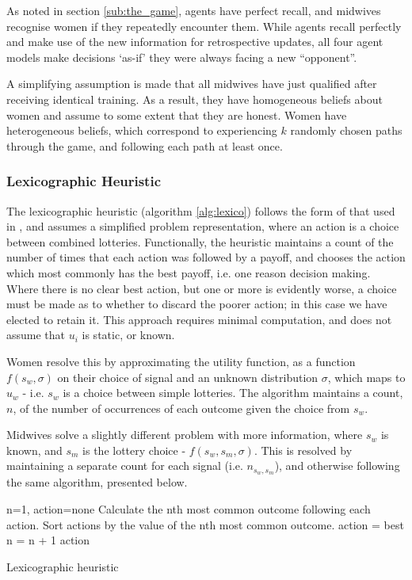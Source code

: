 As noted in section \ref{sub:the_game}, agents have perfect recall, and midwives recognise women if they repeatedly encounter them. While agents recall perfectly and make use of the new information for retrospective updates, all four agent models make decisions `as-if' they were always facing a new \enquote{opponent}.

A simplifying assumption is made that all midwives have just qualified after receiving identical training. As a result, they have homogeneous beliefs about  women and assume to some extent that they are honest.
Women have heterogeneous beliefs, which correspond to experiencing \(k\) randomly chosen paths through the game, and following each path at least once.


\subsubsection{Lexicographic Heuristic}
\label{sub:lexico}

The lexicographic heuristic (algorithm \ref{alg:lexico}) follows the form of that used in \cite{Hau2008}, and assumes a simplified problem representation, where an action is a choice between combined lotteries. Functionally, the heuristic maintains a count of the number of times that each action was followed by a payoff, and chooses the action which most commonly has the best payoff, i.e. one reason decision making. Where there is no clear best action, but one or more is evidently worse, a choice must be made as to whether to discard the poorer action; in this case we have elected to retain it.
This approach requires minimal computation, and does not assume that \(u_{i}\) is static, or known.

Women resolve this by approximating the utility function, as a function \(f(s_{w}, \sigma)\) on their choice of signal and an unknown distribution $\sigma$, which maps to \(u_{w}\) - i.e. \(s_{w}\) is a choice between simple lotteries. The algorithm maintains a count, \(n\), of the number of occurrences of each outcome given the choice from \(s_{w}\).

Midwives solve a slightly different problem with more information, where \(s_{w}\) is known, and \(s_{m}\) is the lottery choice - \(f(s_{w}, s_{m},\sigma)\). This is resolved by maintaining a separate count for each signal (i.e. \(n_{s_{w},s_{m}}\)), and otherwise following the same algorithm, presented below.

\begin{algorithm}
\begin{algorithmic}
\State n=1, action=none
\State Calculate the nth most common outcome following each action.
\State Sort actions by the value of the nth most common outcome.
 \State action = best \EndIf
\State n = n + 1
\EndWhile
\State \Return action
\end{algorithmic}
\caption{Lexicographic heuristic\label{alg:lexico}}
\end{algorithm}

